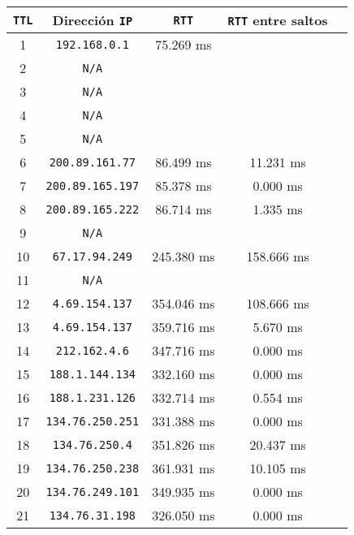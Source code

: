 \renewcommand{\arraystretch}{1.5}
\begin{tabular}{|c|c|c|c|c|} \hline
\texttt{TTL} & Dirección \texttt{IP} & \texttt{RTT} & \texttt{RTT} entre saltos \\ \hline
 1 & \texttt{192.168.0.1}    &  75.269 ms &            \\
 2 & \texttt{N/A}            &            &            \\
 3 & \texttt{N/A}            &            &            \\
 4 & \texttt{N/A}            &            &            \\
 5 & \texttt{N/A}            &            &            \\
 6 & \texttt{200.89.161.77}  &  86.499 ms &  11.231 ms \\
 7 & \texttt{200.89.165.197} &  85.378 ms &   0.000 ms \\
 8 & \texttt{200.89.165.222} &  86.714 ms &   1.335 ms \\
 9 & \texttt{N/A}            &            &            \\
10 & \texttt{67.17.94.249}   & 245.380 ms & 158.666 ms \\
11 & \texttt{N/A}            &            &            \\
12 & \texttt{4.69.154.137}   & 354.046 ms & 108.666 ms \\
13 & \texttt{4.69.154.137}   & 359.716 ms &   5.670 ms \\
14 & \texttt{212.162.4.6}    & 347.716 ms &   0.000 ms \\
15 & \texttt{188.1.144.134}  & 332.160 ms &   0.000 ms \\
16 & \texttt{188.1.231.126}  & 332.714 ms &   0.554 ms \\
17 & \texttt{134.76.250.251} & 331.388 ms &   0.000 ms \\
18 & \texttt{134.76.250.4}   & 351.826 ms &  20.437 ms \\
19 & \texttt{134.76.250.238} & 361.931 ms &  10.105 ms \\
20 & \texttt{134.76.249.101} & 349.935 ms &   0.000 ms \\
21 & \texttt{134.76.31.198}  & 326.050 ms &   0.000 ms \\ \hline
\end{tabular}
